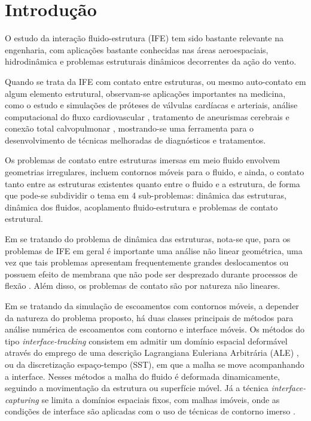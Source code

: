 \documentclass[_ArquivoPrincipal.tex]{subfiles}
\begin{document}
	
\chapter{Introdução}

    
    O estudo da interação fluido-estrutura (IFE) tem sido bastante relevante na engenharia, com aplicações bastante conhecidas nas áreas aeroespaciais, hidrodinâmica e problemas estruturais dinâmicos decorrentes da ação do vento.
    
    Quando se trata da IFE com contato entre estruturas, ou mesmo auto-contato em algum elemento estrutural, observam-se aplicações importantes na medicina, como o estudo e simulações de próteses de válvulas cardíacas e arteriais, análise computacional do fluxo cardiovascular \cite{Takizawa2019}, tratamento de aneurismas cerebrais \cite{Takizawa2013} e conexão total calvopulmonar \cite{Bazilevs2009}, mostrando-se uma ferramenta para o desenvolvimento de técnicas melhoradas de diagnósticos e tratamentos.

    Os problemas de contato entre estruturas imersas em meio fluido envolvem geometrias irregulares, incluem contornos móveis para o fluido, e ainda, o contato tanto entre as estruturas existentes quanto entre o fluido e a estrutura, de forma que pode-se subdividir o tema em 4 sub-problemas: dinâmica das estruturas, dinâmica dos fluidos, acoplamento fluido-estrutura e problemas de contato estrutural.
    
    Em se tratando do problema de dinâmica das estruturas, nota-se que, para os problemas de IFE em geral é importante uma análise não linear geométrica, uma vez que tais problemas apresentam frequentemente grandes deslocamentos ou possuem efeito de membrana que não pode ser desprezado durante processos de flexão \cite{SanchesC:2013,SanchesC:2014}. Além disso, os problemas de contato são por natureza não lineares.

    Em se tratando da simulação de escoamentos com contornos móveis, a depender da natureza do problema proposto, há duas classes principais de métodos para análise numérica de escoamentos com contorno e interface móveis. Os métodos do tipo \textit{interface-tracking} consistem em admitir um domínio espacial deformável através do emprego de uma descrição Lagrangiana Euleriana Arbitrária (ALE) \cite{doneaALE}, ou da discretização espaço-tempo (SST), em que a malha se move acompanhando a interface. Nesses métodos a malha do fluido é deformada dinamicamente, seguindo a movimentação da estrutura ou superfície móvel. Já a técnica \textit{interface-capturing} se limita a domínios espaciais fixos, com malhas imóveis, onde as condições de interface são aplicadas com o uso de técnicas de contorno imerso \cite{Tezduyar2006, Mittal2005239}. 
\end{document}
